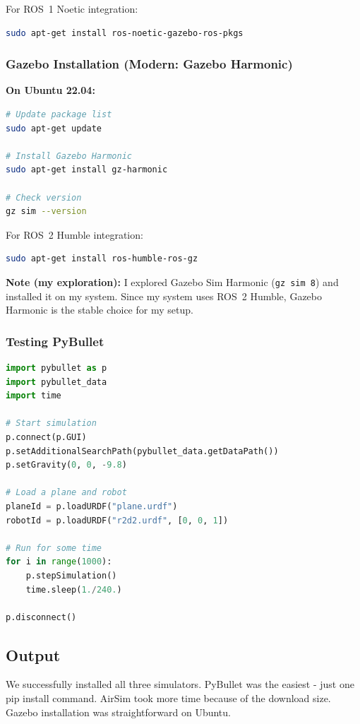 For ROS~1 Noetic integration:
\begin{lstlisting}[language=bash]
sudo apt-get install ros-noetic-gazebo-ros-pkgs
\end{lstlisting}

\subsubsection{Gazebo Installation (Modern: Gazebo Harmonic)}

\textbf{On Ubuntu 22.04:}
\begin{lstlisting}[language=bash]
# Update package list
sudo apt-get update

# Install Gazebo Harmonic
sudo apt-get install gz-harmonic

# Check version
gz sim --version
\end{lstlisting}

For ROS~2 Humble integration:
\begin{lstlisting}[language=bash]
sudo apt-get install ros-humble-ros-gz
\end{lstlisting}

\noindent\textbf{Note (my exploration):} I explored Gazebo Sim Harmonic (\texttt{gz sim 8}) and installed it on my system. Since my system uses ROS~2 Humble, Gazebo Harmonic is the stable choice for my setup.

\subsubsection{Testing PyBullet}

\begin{lstlisting}[language=Python]
import pybullet as p
import pybullet_data
import time

# Start simulation
p.connect(p.GUI)
p.setAdditionalSearchPath(pybullet_data.getDataPath())
p.setGravity(0, 0, -9.8)

# Load a plane and robot
planeId = p.loadURDF("plane.urdf")
robotId = p.loadURDF("r2d2.urdf", [0, 0, 1])

# Run for some time
for i in range(1000):
    p.stepSimulation()
    time.sleep(1./240.)

p.disconnect()
\end{lstlisting}

\subsection{Output}

We successfully installed all three simulators. PyBullet was the easiest - just one pip install command. AirSim took more time because of the download size. Gazebo installation was straightforward on Ubuntu.

